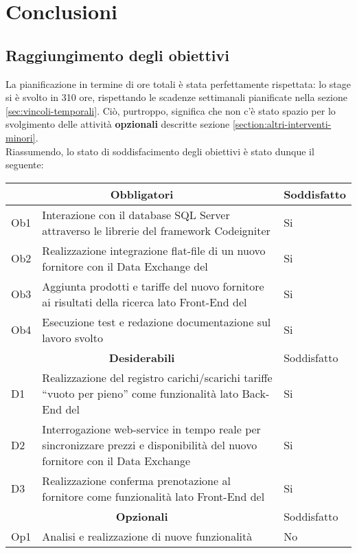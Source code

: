 
\chapter{Conclusioni}
\label{cap:conclusioni}

\section{Raggiungimento degli obiettivi}
La pianificazione in termine di ore totali è stata perfettamente rispettata: lo stage si è svolto in 310 ore, rispettando le scadenze settimanali pianificate nella sezione \ref{sec:vincoli-temporali}. Ciò, purtroppo, significa che non c'è stato spazio per lo svolgimento delle attività \textbf{opzionali} descritte sezione \ref{section:altri-interventi-minori}.\\Riassumendo, lo stato di soddisfacimento degli obiettivi è stato dunque il seguente:
\begin{center}
	\def\arraystretch{1.5}
	\begin{longtable}{p{1.5cm} p{8.5cm} p{1.5cm} } 
		\hline
		\multicolumn{2}{c}{\textbf{Obbligatori}} & Soddisfatto\\
		\hline
		Ob1 & Interazione con il database SQL Server attraverso le librerie del \gls{framework} Codeigniter & Si\\
		\hline
		Ob2 & Realizzazione integrazione flat-file di un nuovo fornitore con il Data Exchange del \bookingEngine & Si\\
		\hline
		Ob3 & Aggiunta prodotti e tariffe del nuovo fornitore ai risultati della ricerca lato Front-End del \bookingEngine & Si\\
		\hline
		Ob4 & Esecuzione test e redazione documentazione sul lavoro svolto & Si\\
		\hline
		\multicolumn{2}{c}{\textbf{Desiderabili}} & Soddisfatto\\
		\hline
		D1 & Realizzazione del registro carichi/scarichi tariffe “vuoto per pieno” come	funzionalità lato Back-End del \bookingEngine & Si\\
		\hline
		D2 & Interrogazione web-service in tempo reale per sincronizzare prezzi e disponibilità del nuovo fornitore con il Data Exchange & Si\\
		\hline
		D3 & Realizzazione conferma prenotazione al fornitore come funzionalità lato Front-End del \bookingEngine & Si\\
		\hline
		\multicolumn{2}{c}{\textbf{Opzionali}} & Soddisfatto\\
		\hline
		Op1 & Analisi e realizzazione di nuove funzionalità & No\\
		\hline
	\end{longtable}
\end{center}
